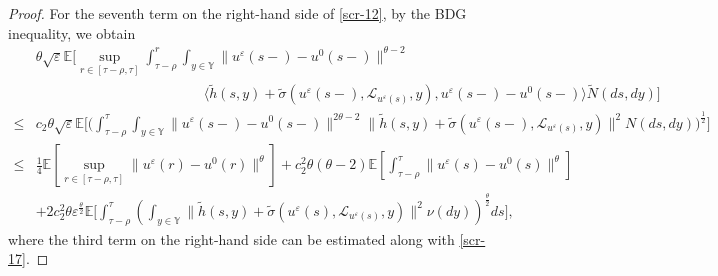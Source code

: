 \documentclass[11pt]{article}
\numberwithin{equation}{section}
\theoremstyle{plain}
\begin{document}
\begin{proof}
 For the seventh term on the right-hand side of \eqref{scr-12},
 by the BDG inequality, we obtain
 \begin{align}\label{scr-18}  
      & \theta \sqrt{\varepsilon} 
               \mathbb{E}
                        \bigg[ \sup_{r \in [\tau -\rho, \tau] }
                                     \int_{\tau-\rho}^{r} 
                                        \int_{y \in \mathbb{Y} } 
                                           \| u^{\varepsilon}(s-) - u^0(s-) \|^{\theta - 2}  \nonumber\\
      &\qquad\qquad\qquad\qquad\qquad\qquad                              
                                            \langle \widetilde{h}(s,y) 
                                            	         + \widetilde{\sigma}(u^{\varepsilon}(s-), \mathcal{L}_{u^{\varepsilon}(s)}, y),  
                                                         u^{\varepsilon}(s-) - u^0(s-) 
                                            \rangle  \widetilde{N}(ds, dy)
                        \bigg]  \nonumber\\
\le & c_2 \theta \sqrt{\varepsilon} 
               \mathbb{E}
                        \bigg[ 
                                  \Big( \int_{\tau-\rho}^{\tau} 
                                              \int_{y \in \mathbb{Y} } 
                                                  \| u^{\varepsilon}(s-) - u^0(s-) \|^{2\theta - 2}
                                                  \| \widetilde{h}(s,y) 
                                            	         + \widetilde{\sigma}(u^{\varepsilon}(s-), \mathcal{L}_{u^{\varepsilon}(s)}, y)
                                            	  \|^2
                                               N(ds, dy)
                                  \Big)^{\frac{1}{2} }
                        \bigg]  \nonumber\\
\le &  \frac{1}{4} 
               \mathbb{E}
                      \left[ \sup_{r \in [\tau-\rho, \tau] } 
                                    \| u^{\varepsilon}(r) - u^0(r) \|^{\theta}
                      \right] 
         + c_2^2 \theta (\theta - 2) 
                 \mathbb{E}
                        \left[ \int_{\tau-\rho}^{\tau} \| u^{\varepsilon}(s) - u^0(s) \|^{\theta}
                        \right]  \nonumber\\
     & + 2 c_2^2 \theta \varepsilon^{\frac{\theta}{2} } 
                       \mathbb{E}
                                \bigg[ \int_{\tau-\rho}^{\tau}
                                             \left( \int_{y \in \mathbb{Y} } 
                                                          \| \widetilde{h}(s,y) 
                                            	              + \widetilde{\sigma}(u^{\varepsilon}(s), \mathcal{L}_{u^{\varepsilon}(s)}, y)
                                            	          \|^2
                                                       \nu(dy) 
                                            \right)^{\frac{\theta}{2} } ds 
                        \bigg],                                          
 \end{align}    
 where the third term on the right-hand side can be estimated along with \eqref{scr-17}.


\end{proof}
\end{document}
